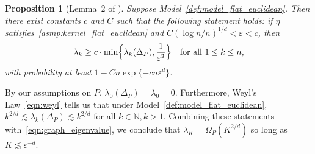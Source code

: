 \documentclass[aos]{imsart}
\theoremstyle{plain}
\newtheorem{proposition}{Proposition}
\theoremstyle{definition}
\theoremstyle{remark}
\newcommand{\1}{\mathbf{1}}
\begin{document}
\begin{proposition}[Lemma~2 of \cite{green2021}]
	\label{prop:graph_eigenvalue}
	Suppose Model~\ref{def:model_flat_euclidean}. Then there exist constants $c$ and $C$ such that the following statement holds: if $\eta$ satisfies~\ref{asmp:kernel_flat_euclidean} and $C(\log n/n)^{1/d} < \varepsilon < c$, then
	\begin{equation}
	\label{eqn:graph_eigenvalue}
	\lambda_k \geq c \cdot \min\Bigl\{\lambda_k(\Delta_P), \frac{1}{\varepsilon^{2}} \Bigr\} \quad \textrm{for all $1 \leq k \leq n$,}
	\end{equation}
	with probability at least $1 - Cn\exp\{-c n\varepsilon^d\}$. 
\end{proposition}
By our assumptions on $P$, $\lambda_0(\Delta_P) = \lambda_0 = 0$. Furthermore, Weyl's Law~\eqref{eqn:weyl} tells us that under Model~\ref{def:model_flat_euclidean}, $k^{2/d} \lesssim \lambda_{k}(\Delta_P) \lesssim k^{2/d}$ for all $k \in \mathbb{N}, k > 1$. Combining these statements with~\eqref{eqn:graph_eigenvalue}, we conclude that $\lambda_{K} = \Omega_P(K^{2/d})$ so long as $K \lesssim \varepsilon^{-d}$. 
\end{document}
